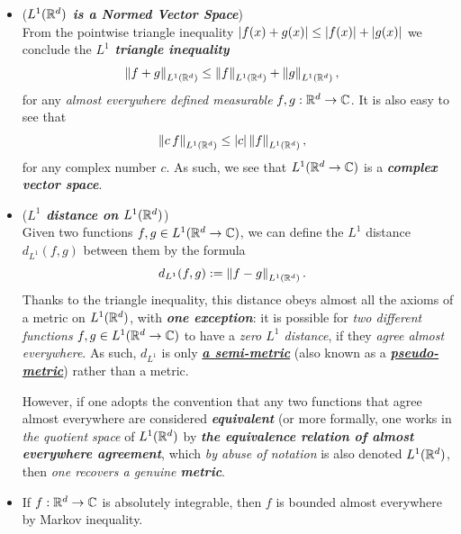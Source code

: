 \documentclass[11pt]{article}
\begin{document}
\begin{itemize}
\item \begin{remark} (\emph{\textbf{$L^1({\mathbb R}^d)$ is a Normed Vector Space}})\\
From the pointwise triangle inequality $\left\lvert f(x) + g(x) \right\rvert \le \left\lvert f(x) \right\rvert + \left\lvert g(x) \right\rvert$  we conclude the \emph{\textbf{$L^1$ triangle inequality}}
\begin{align*}
\left\|f  + g\right\|_{L^1({\mathbb R}^d)} &\le \left\|f\right\|_{L^1({\mathbb R}^d)} + \left\|g\right\|_{L^1({\mathbb R}^d)},
\end{align*} for any \emph{almost everywhere defined measurable} $f, g : {\mathbb R}^d \rightarrow {\mathbb C}$. It is also easy to see that
\begin{align*}
\left\|c\,f\right\|_{L^1({\mathbb R}^d)} &\le \left\lvert c \right\rvert\left\|f\right\|_{L^1({\mathbb R}^d)},
\end{align*} for any complex number $c$. As such, we see that $L^1({\mathbb R}^d \rightarrow {\mathbb C})$ is a \emph{\textbf{complex vector space}}. 
\end{remark}

\item \begin{remark}  (\emph{\textbf{$L^1$ distance on $L^1({\mathbb R}^d)$}})\\
Given two functions $f, g \in L^1({\mathbb R}^d \rightarrow {\mathbb C})$, we can define the $L^1$ distance $d_{L^1}(f, g)$ between them by the formula
\begin{align*}
d_{L^1}(f, g) &:= \left\|f - g\right\|_{L^1({\mathbb R}^d)}.
\end{align*}
Thanks to the triangle inequality, this distance obeys almost all the axioms of a metric on $L^1({\mathbb R}^d)$, with \emph{\textbf{one exception}}: it is possible for \emph{two different functions} $f, g \in L^1({\mathbb R}^d \rightarrow {\mathbb C})$ to have a \emph{zero $L^1$ distance}, if they \emph{agree almost everywhere}. As such, $d_{L^1}$ is only \underline{\emph{\textbf{a semi-metric}}} (also known as a \underline{\emph{\textbf{pseudo-metric}}}) rather than a metric.

However, if one adopts the convention that any two functions that agree almost everywhere are considered \emph{\textbf{equivalent}} (or more formally, one works in \emph{the quotient space} of $L^1({\mathbb R}^d)$ by \emph{\textbf{the equivalence relation of almost everywhere agreement}}, which \emph{by abuse of notation} is also denoted $L^1({\mathbb R}^d)$, then \emph{one recovers a genuine \textbf{metric}}.
\end{remark}


\item \begin{exercise}
If $f : {\mathbb R}^d \rightarrow {\mathbb C}$ is absolutely integrable, then $f$ is bounded almost everywhere by Markov inequality. 
\end{exercise}


\end{itemize}
\end{document}
